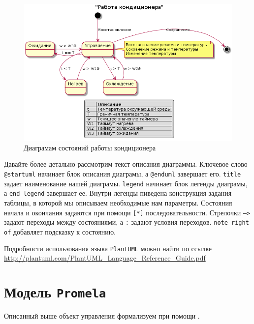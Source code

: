 \documentclass[12pt, twoside]{report}
\begin{document}
\begin{figure}
  \includegraphics[width=\textwidth]{cond_sample}
  \centering
    \caption{Диаграмам состояний работы кондиционера}
  \label{fig:cond_diagram}
\end{figure}

Давайте более детально рассмотрим текст описания диаграммы.
Ключевое слово \texttt{@startuml} начинает блок описания диаграмы, а \texttt{@enduml} завершает его. \texttt{title} задает наименование нашей диаграмы. 
\texttt{legend} начинает блок легенды диаграмы, а \texttt{end legend} завершает ее. Внутри легенды пиведена конструкция задания таблицы, в которой мы описываем 
необходимые нам параметры. Состояния начала и окончания задаются при помощи \texttt{[*]} последовательности. Стрелочки \texttt{-->} задают переходы 
между состояниями, а \texttt{:} задают условия переходов. \texttt{note right of} добавляет подсказку к состоянию.

Подробности использования языка \texttt{PlantUML} можно найти по ссылке \url{http://plantuml.com/PlantUML_Language_Reference_Guide.pdf}

\newpage
\section*{Модель \texttt{Promela}}\label{practical_work_2}

Описанный выше объект управления формализуем при помощи .
\end{document}
